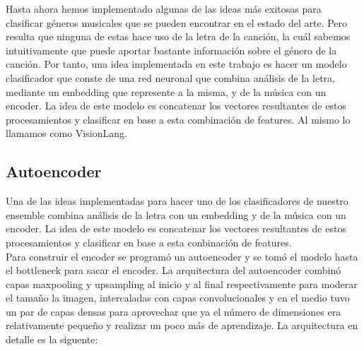 \documentclass[colorinlistoftodos,twoside,twocolumn,10pt]{article} %
\begin{document}
Hasta ahora hemos implementado algunas de las ideas m\'as exitosas para clasificar g\'eneros musicales que se pueden encontrar en el estado del arte. Pero resulta que ninguna de estas hace uso de la letra de la canci\'on, la cu\'al sabemos intuitivamente que puede aportar bastante informaci\'on sobre el g\'enero de la canci\'on. Por tanto, una idea implementada en este trabajo es hacer un modelo clasificador que conste de una red neuronal que combina análisis de la letra, mediante un embedding que represente a la misma, y de la música con un encoder. La idea de este modelo es concatenar los vectores resultantes de estos procesamientos y clasificar en base a esta combinación de features. Al mismo lo llamamos como VisionLang.

\subsection{Autoencoder}
Una de las ideas implementadas para hacer uno de los clasificadores de nuestro ensemble combina análisis de la letra con un embedding y de la música con un encoder. La idea de este modelo es concatenar los vectores resultantes de estos procesamientos y clasificar en base a esta conbinación de features. \\
Para construir el encoder se programó un autoencoder y se tomó el modelo hasta el bottleneck para sacar el encoder. La arquitectura del autoencoder combinó capas maxpooling y upsampling al inicio y al final respectivamente para moderar el tamaño la imagen, intercaladas con capas convolucionales y en el medio tuvo un par de capas densas para aprovechar que ya el número de dimensiones era relativamente pequeño y realizar un poco más de aprendizaje. La arquitectura en detalle es la siguente:
\end{document}
